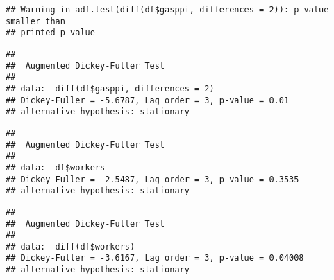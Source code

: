 \documentclass[
]{article}
\newenvironment{Shaded}{\begin{snugshade}}{\end{snugshade}}
\newcommand{\CommentTok}[1]{\textcolor[rgb]{0.56,0.35,0.01}{\textit{#1}}}
\newcommand{\FunctionTok}[1]{\textcolor[rgb]{0.13,0.29,0.53}{\textbf{#1}}}
\newcommand{\NormalTok}[1]{#1}
\newcommand{\SpecialCharTok}[1]{\textcolor[rgb]{0.81,0.36,0.00}{\textbf{#1}}}
\begin{document}
\begin{verbatim}
## Warning in adf.test(diff(df$gasppi, differences = 2)): p-value smaller than
## printed p-value
\end{verbatim}

\begin{verbatim}
## 
##  Augmented Dickey-Fuller Test
## 
## data:  diff(df$gasppi, differences = 2)
## Dickey-Fuller = -5.6787, Lag order = 3, p-value = 0.01
## alternative hypothesis: stationary
\end{verbatim}

\begin{Shaded}
\end{Shaded}

\begin{verbatim}
## 
##  Augmented Dickey-Fuller Test
## 
## data:  df$workers
## Dickey-Fuller = -2.5487, Lag order = 3, p-value = 0.3535
## alternative hypothesis: stationary
\end{verbatim}

\begin{Shaded}
\end{Shaded}

\begin{verbatim}
## 
##  Augmented Dickey-Fuller Test
## 
## data:  diff(df$workers)
## Dickey-Fuller = -3.6167, Lag order = 3, p-value = 0.04008
## alternative hypothesis: stationary
\end{verbatim}

\begin{Shaded}
\end{Shaded}
\end{document}
